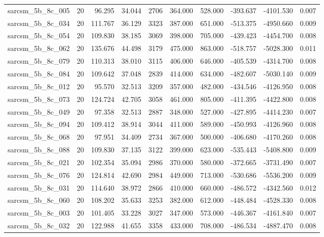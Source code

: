 \begin{tabular}{lrrrrrrrrr}
sarcsm\_5b\_8c\_005 & 20 & 96.295 & 34.044 & 2706 & 364.000 & 528.000 & -393.637 & -4101.530 & 0.007 \\
sarcsm\_5b\_8c\_034 & 20 & 111.767 & 36.129 & 3323 & 387.000 & 651.000 & -513.375 & -4950.660 & 0.009 \\
sarcsm\_5b\_8c\_054 & 20 & 109.830 & 38.185 & 3069 & 398.000 & 705.000 & -439.423 & -4454.700 & 0.008 \\
sarcsm\_5b\_8c\_062 & 20 & 135.676 & 44.498 & 3179 & 475.000 & 863.000 & -518.757 & -5028.300 & 0.011 \\
sarcsm\_5b\_8c\_079 & 20 & 110.313 & 38.010 & 3115 & 406.000 & 646.000 & -405.539 & -4314.700 & 0.008 \\
sarcsm\_5b\_8c\_084 & 20 & 109.642 & 37.048 & 2839 & 414.000 & 634.000 & -482.607 & -5030.140 & 0.009 \\
sarcsm\_5b\_8c\_012 & 20 & 95.570 & 32.513 & 3209 & 357.000 & 482.000 & -434.546 & -4126.950 & 0.008 \\
sarcsm\_5b\_8c\_073 & 20 & 124.724 & 42.705 & 3058 & 461.000 & 805.000 & -411.395 & -4422.800 & 0.008 \\
sarcsm\_5b\_8c\_049 & 20 & 97.358 & 32.513 & 2887 & 348.000 & 527.000 & -427.895 & -4414.230 & 0.007 \\
sarcsm\_5b\_8c\_094 & 20 & 109.412 & 38.914 & 3044 & 411.000 & 589.000 & -450.993 & -4126.960 & 0.008 \\
sarcsm\_5b\_8c\_068 & 20 & 97.951 & 34.409 & 2734 & 367.000 & 500.000 & -406.680 & -4170.260 & 0.008 \\
sarcsm\_5b\_8c\_088 & 20 & 109.830 & 37.135 & 3122 & 399.000 & 623.000 & -535.443 & -5408.800 & 0.009 \\
sarcsm\_5b\_8c\_021 & 20 & 102.354 & 35.094 & 2986 & 370.000 & 580.000 & -372.665 & -3731.490 & 0.007 \\
sarcsm\_5b\_8c\_076 & 20 & 124.814 & 42.690 & 2984 & 449.000 & 713.000 & -530.686 & -5536.200 & 0.009 \\
sarcsm\_5b\_8c\_031 & 20 & 114.640 & 38.972 & 2866 & 410.000 & 660.000 & -486.572 & -4342.560 & 0.012 \\
sarcsm\_5b\_8c\_060 & 20 & 108.202 & 35.633 & 3253 & 382.000 & 612.000 & -448.484 & -4528.330 & 0.008 \\
sarcsm\_5b\_8c\_003 & 20 & 101.405 & 33.228 & 3027 & 347.000 & 573.000 & -446.367 & -4161.840 & 0.007 \\
sarcsm\_5b\_8c\_032 & 20 & 122.988 & 41.655 & 3358 & 433.000 & 708.000 & -486.534 & -4887.470 & 0.008 \\

\end{tabular}
